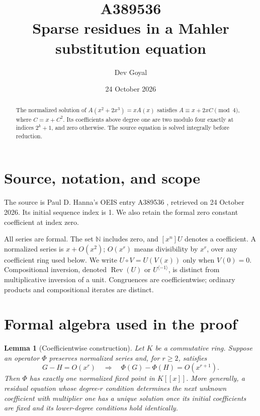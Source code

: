 \documentclass[11pt,a4paper]{article}
\title{A389536\\[4pt]\large Sparse residues in a Mahler substitution equation}
\author{Dev Goyal}
\date{24 October 2026}
\newtheorem{lemma}[theorem]{Lemma}
\theoremstyle{remark}
\newcommand{\N}{\mathbb N}
\newcommand{\ps}[1]{#1[[x]]}
\newcommand{\Rev}{\operatorname{Rev}}
\newcommand{\rev}{^{\langle-1\rangle}}
\begin{document}
\maketitle
\begin{center}
\end{center}
\begin{abstract}
The normalized solution of $A(x^2+2x^3)=xA(x)$ satisfies $A\equiv x+2xC\pmod4$, where $C=x+C^2$. Its coefficients above degree one are two modulo four exactly at indices $2^k+1$, and zero otherwise. The source equation is solved integrally before reduction.
\end{abstract}

\section{Source, notation, and scope}

The source is Paul D. Hanna's OEIS entry A389536 \cite{oeis536},
retrieved on 24 October 2026. Its initial sequence index is 1.
We also retain the formal zero constant coefficient at index zero.

All series are formal. The set $\N$ includes zero, and $[x^n]U$ denotes a
coefficient. A normalized series is $x+O(x^2)$; $O(x^r)$ means divisibility
by $x^r$, over any coefficient ring used below. We write $U\circ V=U(V(x))$
only when $V(0)=0$. Compositional inversion, denoted $\Rev(U)$ or $U\rev$,
is distinct from multiplicative inversion of a unit. Congruences are
coefficientwise; ordinary products and compositional iterates are distinct.

\section{Formal algebra used in the proof}

\begin{lemma}[Coefficientwise construction]\label{lem:contraction}
Let $K$ be a commutative ring. Suppose an operator $\Phi$ preserves
normalized series and, for $r\ge2$, satisfies
\[
 G-H=O(x^r)\quad\Longrightarrow\quad
 \Phi(G)-\Phi(H)=O(x^{r+1}).
\]
Then $\Phi$ has exactly one normalized fixed point in $\ps K$.
More generally, a residual equation whose degree-$r$ condition determines
the next unknown coefficient with multiplier one has a unique solution
once its initial coefficients are fixed and its lower-degree conditions
hold identically.
\end{lemma}
\end{document}
